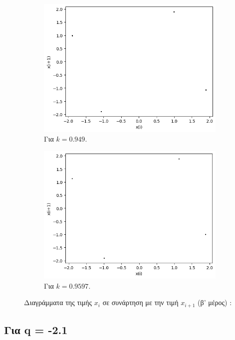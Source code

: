 \begin{figure}[h!]
\begin{subfigure}[b]{0.4\textwidth}
		\includegraphics[width=\textwidth]{LateX images/graphs q19/g13}
		\caption{Για $k=0.949$.}
		\label{f:k102}
	\end{subfigure}
	\hfill
	\begin{subfigure}[b]{0.4\textwidth}
		\centering
		\includegraphics[width=\textwidth]{LateX images/graphs q19/g14}
		\caption{Για $k=0.9597$.}
		\label{f:k103}
	\end{subfigure}
	\hfill
	\caption{Διαγράμματα της τιμής \(x_i\) σε συνάρτηση με την τιμή \(x_{i+1}\) (β' μέρος) :}
	\label{f:k243}
\end{figure}

\clearpage

\subsection{Για q = -2.1}

